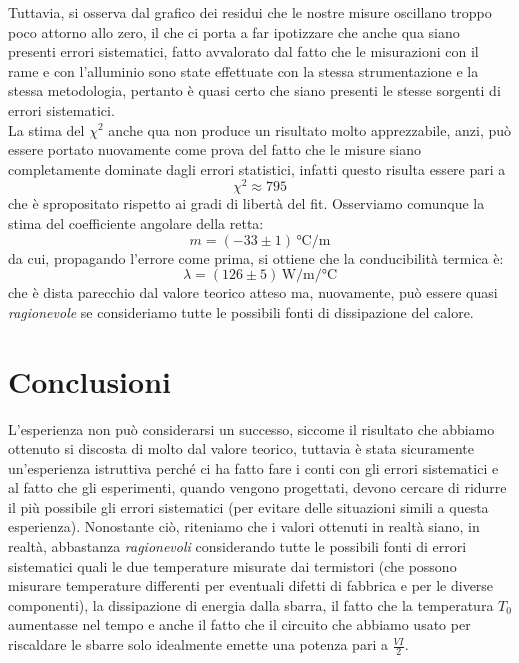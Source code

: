 \documentclass{article}
\begin{document}
\noindent Tuttavia, si osserva dal grafico dei residui che le nostre misure oscillano troppo poco attorno allo zero, il che ci porta a far ipotizzare che anche qua siano presenti errori sistematici, fatto avvalorato dal fatto che le misurazioni con il rame e con l'alluminio sono state effettuate con la stessa strumentazione e la stessa metodologia, pertanto è quasi certo che siano presenti le stesse sorgenti di errori sistematici.	\\
La stima del $\chi^2$ anche qua non produce un risultato molto apprezzabile, anzi, può essere portato nuovamente come prova del fatto che le misure siano completamente dominate dagli errori statistici, infatti questo risulta essere pari a
$$
	\chi^2 \approx 795
$$
che è spropositato rispetto ai gradi di libertà del fit. Osserviamo comunque la stima del coefficiente angolare della retta:
\begin{equation}
	m = (-33 \pm 1) \, \unit{\celsius\per\meter}
\end{equation}
da cui, propagando l'errore come prima, si ottiene che la conducibilità termica è:
\begin{equation}
	\lambda = (126 \pm 5) \, \unit{\watt\per\meter\per\celsius}
\end{equation}
che è dista parecchio dal valore teorico atteso ma, nuovamente, può essere quasi \emph{ragionevole} se consideriamo tutte le possibili fonti di dissipazione del calore.
\newpage
\section{Conclusioni}

L'esperienza non può considerarsi un successo, siccome il risultato che abbiamo ottenuto si discosta di molto dal valore teorico, tuttavia è stata sicuramente un'esperienza istruttiva perché ci ha fatto fare i conti con gli errori sistematici e al fatto che gli esperimenti, quando vengono progettati, devono cercare di ridurre il più possibile gli errori sistematici (per evitare delle situazioni simili a questa esperienza). Nonostante ciò, riteniamo che i valori ottenuti in realtà siano, in realtà, abbastanza \emph{ragionevoli} considerando tutte le possibili fonti di errori sistematici quali le due temperature misurate dai termistori (che possono misurare temperature differenti per eventuali difetti di fabbrica e per le diverse componenti), la dissipazione di energia dalla sbarra, il fatto che la temperatura $T_0$ aumentasse nel tempo e anche il fatto che il circuito che abbiamo usato per riscaldare le sbarre solo idealmente emette una potenza pari a $\frac{VI}{2}$. \\
\end{document}
